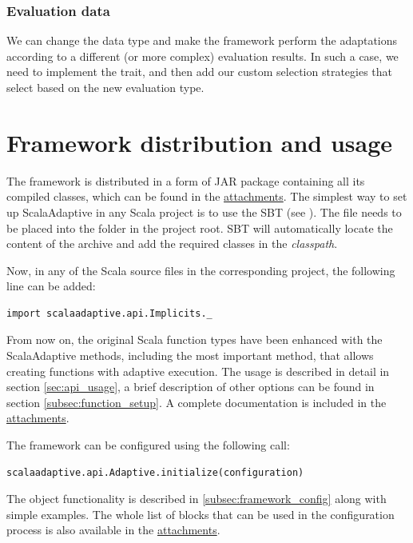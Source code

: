 \subsubsection{Evaluation data}

We can change the  data type and make the framework perform the adaptations according to a different (or more complex) evaluation results. In such a case, we need to implement the  trait, and then add our custom selection strategies that select based on the new evaluation type.

\section{Framework distribution and usage}

The framework is distributed in a form of JAR package containing all its compiled classes, which can be found in the \hyperref[attach:cd]{attachments}. The simplest way to set up ScalaAdaptive in any Scala project is to use the SBT (see \cite{noauthor_sbt_nodate}). The  file needs to be placed into the  folder in the project root. SBT will automatically locate the content of the archive and add the required classes in the \textit{classpath}.

Now, in any of the Scala source files in the corresponding project, the following line can be added:
\lstset{style=Scala}
\begin{lstlisting}
import scalaadaptive.api.Implicits._
\end{lstlisting}

From now on, the original Scala function types have been enhanced with the ScalaAdaptive methods, including the most important  method, that allows creating functions with adaptive execution. The usage is described in detail in section \ref{sec:api_usage}, a brief description of other options can be found in section \ref{subsec:function_setup}. A complete documentation is included in the \hyperref[attach:scaladoc]{attachments}.

The framework can be configured using the following call:
\lstset{style=Scala}
\begin{lstlisting}
scalaadaptive.api.Adaptive.initialize(configuration)
\end{lstlisting}

The  object functionality is described in \ref{subsec:framework_config} along with simple examples. The whole list of blocks that can be used in the configuration process is also available in the \hyperref[attach:config_blocks]{attachments}.